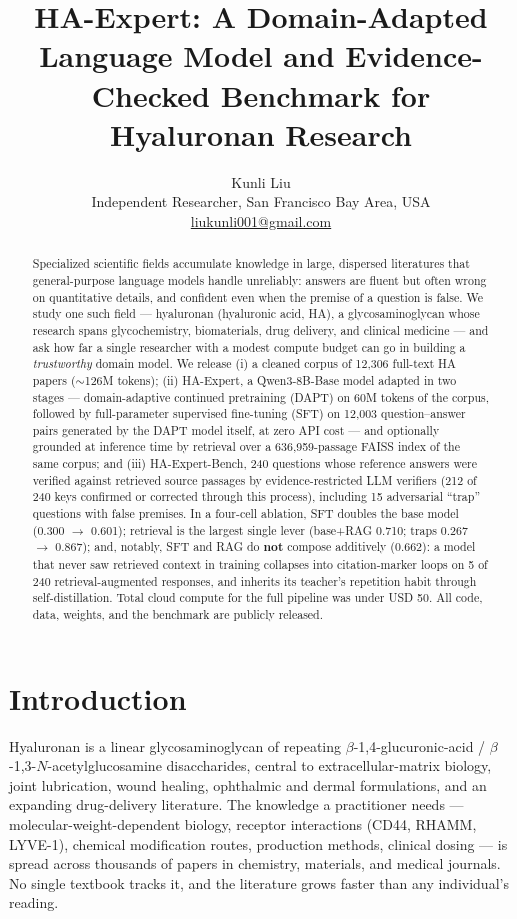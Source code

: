 \documentclass[11pt]{article}
\title{HA-Expert: A Domain-Adapted Language Model and Evidence-Checked
Benchmark for Hyaluronan Research}
\author{Kunli Liu\\
Independent Researcher, San Francisco Bay Area, USA\\
\href{mailto:liukunli001@gmail.com}{liukunli001@gmail.com}}
\date{}
\begin{document}
\maketitle

\begin{abstract}
Specialized scientific fields accumulate knowledge in large, dispersed
literatures that general-purpose language models handle unreliably: answers
are fluent but often wrong on quantitative details, and confident even when
the premise of a question is false. We study one such field --- hyaluronan
(hyaluronic acid, HA), a glycosaminoglycan whose research spans
glycochemistry, biomaterials, drug delivery, and clinical medicine --- and
ask how far a single researcher with a modest compute budget can go in
building a \emph{trustworthy} domain model. We release (i) a cleaned corpus
of 12,306 full-text HA papers ($\sim$126M tokens); (ii) HA-Expert, a
Qwen3-8B-Base model adapted in two stages --- domain-adaptive continued
pretraining (DAPT) on 60M tokens of the corpus, followed by full-parameter
supervised fine-tuning (SFT) on 12,003 question--answer pairs generated by
the DAPT model itself, at zero API cost --- and optionally grounded at
inference time by retrieval over a 636,959-passage FAISS index of the same
corpus; and (iii) HA-Expert-Bench, 240 questions whose reference answers
were verified against retrieved source passages by evidence-restricted LLM
verifiers (212 of 240 keys confirmed or corrected through this process),
including 15 adversarial ``trap'' questions with false premises. In a
four-cell ablation, SFT doubles the base model (0.300 $\rightarrow$ 0.601);
retrieval is the largest single lever (base+RAG 0.710; traps
0.267 $\rightarrow$ 0.867); and, notably, SFT and RAG do \textbf{not}
compose additively (0.662): a model that never saw retrieved context in
training collapses into citation-marker loops on 5 of 240
retrieval-augmented responses, and inherits its teacher's repetition habit
through self-distillation. Total cloud compute for the full pipeline was
under USD 50. All code, data, weights, and the benchmark are publicly
released.
\end{abstract}

\section{Introduction}
\label{sec:intro}

Hyaluronan is a linear glycosaminoglycan of repeating
$\beta$-1,4-glucuronic-acid / $\beta$-1,3-$N$-acetylglucosamine
disaccharides, central to extracellular-matrix biology, joint lubrication,
wound healing, ophthalmic and dermal formulations, and an expanding
drug-delivery literature. The knowledge a practitioner needs ---
molecular-weight-dependent biology, receptor interactions (CD44, RHAMM,
LYVE-1), chemical modification routes, production methods, clinical
dosing --- is spread across thousands of papers in chemistry, materials,
and medical journals. No single textbook tracks it, and the literature
grows faster than any individual's reading.
\end{document}
